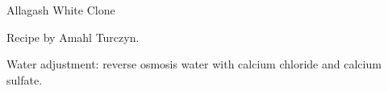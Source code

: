 \stylesection{\stylewitbier}

\begin{recipe}{Allagash White Clone}

\begin{aboutblock}
Recipe by Amahl Turczyn. 
\end{aboutblock}


\begin{methodandtiming}

\begin{mashsteps}
\end{mashsteps}

\begin{fermentationsteps}
\end{fermentationsteps}

\begin{directions}
Water adjustment: reverse osmosis water with  calcium chloride and
 calcium sulfate.
\end{directions}

\end{methodandtiming}

\recipebreak

\begin{ingredientsblock}

\begin{malts}
\end{malts}

\begin{hops}

\end{hops}


\end{ingredientsblock}

\end{recipe}

